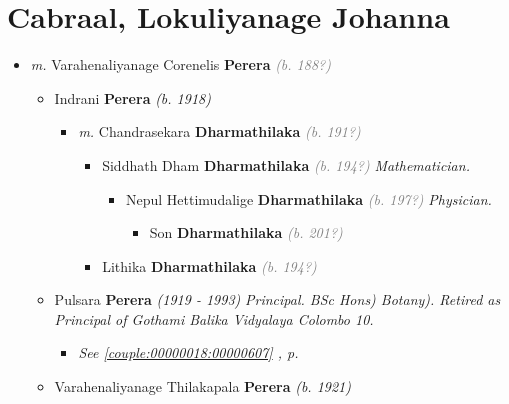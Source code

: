\documentclass[10pt, openany]{book}
\begin{document}
\chapter{Cabraal, Lokuliyanage Johanna}
\label{00000129}
\textcolor{slmaroon}{\textit{}}
\begin{itemize}
\item{\textit{m.} Varahenaliyanage Corenelis \textbf{Perera} \textcolor{gray}{\textit{(b. 188?)}}   \label{couple:00000129:00000613} \begin{itemize}
\item{Indrani \textbf{Perera} \textcolor{slorange}{\textit{(b. 1918)}}
\begin{itemize}
\item{\textit{m.} Chandrasekara \textbf{Dharmathilaka} \textcolor{gray}{\textit{(b. 191?)}}   \label{couple:00000169:00000598} \begin{itemize}
\item{Siddhath Dham \textbf{Dharmathilaka} \textcolor{gray}{\textit{(b. 194?)}} \textcolor{slmaroon}{\textit{Mathematician.}}
\begin{itemize}
\item{Nepul Hettimudalige \textbf{Dharmathilaka} \textcolor{gray}{\textit{(b. 197?)}} \textcolor{slmaroon}{\textit{Physician.}}
\begin{itemize}
\item{Son \textbf{Dharmathilaka} \textcolor{gray}{\textit{(b. 201?)}}
 }
\end{itemize}
  }
\end{itemize}
  }
\item{Lithika \textbf{Dharmathilaka} \textcolor{gray}{\textit{(b. 194?)}}
 }
\end{itemize}}
\end{itemize}
 }
\item{Pulsara \textbf{Perera} \textcolor{slorange}{\textit{(1919 - 1993)}} \textcolor{slmaroon}{\textit{Principal.
BSc Hons) Botany).
Retired as Principal of Gothami Balika Vidyalaya Colombo 10.}}
\begin{itemize}
\item{\textcolor{slteal}{\textit{See  \autoref{couple:00000018:00000607} \textit{, p. \pageref{couple:00000018:00000607} }}}}
\end{itemize}
 }
\item{Varahenaliyanage Thilakapala \textbf{Perera} \textcolor{slorange}{\textit{(b. 1921)}}
}
\end{itemize}}
\end{itemize}
\end{document}
